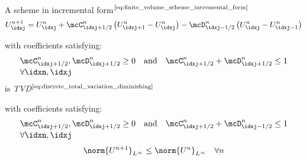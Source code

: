 \begin{lemmabox}\nospacing
    \begin{lemma}\label{lemma:hartens_lemma}\leavevmode\\
        A scheme in incremental form$^{\text{\cref{eq:finite_volume_scheme_incremental_form}}}$
        \begin{align}
        U_{\idxj}^{n+1}=U_{\idxj}^{n}+\mcC_{\idxj+1/2}^{n} \left(U_{\idxj+1}^{n}-U_{\idxj}^{n}\right)-\mcD_{\idxj-1/2}^{n} \left(U_{\idxj}^{n}-U_{\idxj-1}^{n}\right)\label{eq:finite_volume_scheme_incremental_form}
        \end{align}
        \begin{numberlistnosep}
          \item with coefficients satisfying:
        \begin{align}
          &\mcC_{\idxj+1/2}^{n},\mcD_{\idxj+1/2}^{n}\geq0&&\text{and}&&\mcC_{\idxj+1/2}^{n}+\mcD_{\idxj+1/2}^{n}\leq1\nonumber\\[-1\jot]
          &\forall\idxn,\idxj\label{eq:hartens_lemma}
        \end{align}
        is \textit{TVD}$^{\text{\cref{eq:discrete_total_variation_diminishing}}}$
        \item with coefficients satisfying:
        \begin{align}
          &\mcC_{\idxj+1/2}^{n},\mcD_{\idxj+1/2}^{n}\geq0&&\text{and}&&\mcC_{\idxj+1/2}^{n}+\mcD_{\idxj-1/2}^{n}\leq1\nonumber\\[-1\jot]
          &\forall\idxn,\idxj
        \end{align}
        \begin{align}
          \norm{U^{n+1}}_{L^{\infty}}\leq\norm{U^{n}}_{L^{\infty}}&&\forall n
        \end{align}
        \end{numberlistnosep}
    \end{lemma}
\end{lemmabox}

